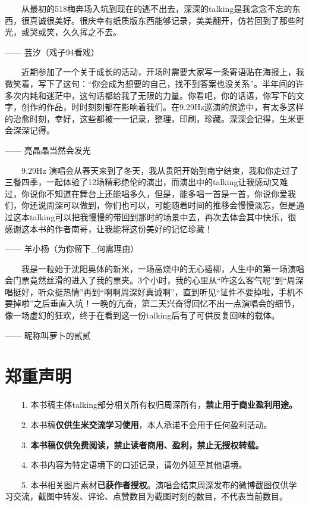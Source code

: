 \documentclass[]{ctexbook}
\begin{document}
  从最初的518梅奔场入坑到现在的逃不出去，深深的talking是我念念不忘的东西，很真诚很美好。很庆幸有纸质版东西能够记录，美美翻开，仿若回到了那些时光，或哭或笑，久久挥之不去。

------ 芸汐（戏子94看戏）

  近期参加了一个关于成长的活动，开场时需要大家写一条寄语贴在海报上，我微笑着，写下了这句：``你会成为想要的自己，找不到答案也没关系''。半年间的许多次内耗和迷茫中，这句话都给我了无限的力量。你看吧，你的话语，你写下的文字，创作的作品，时时刻刻都在影响着我们。在9.29Hz巡演的旅途中，有太多这样的治愈时刻，幸好，这些都被一一记录，整理，印刷，珍藏。深深会记得，生米更会深深记得。

------ 亮晶晶当然会发光

  9.29Hz 演唱会从春天来到了冬天，我从贵阳开始到南宁结束，我和你走过了三餐四季，一起体验了12场精彩绝伦的演出，而演出中的talking让我感动又难过，你说你不知道在舞台上还能唱多久，但是，能多唱一首是一首，你说你爱我们，你还说周深可以做到，你们也可以，可能随着时间的推移会慢慢淡忘，但是通过这本talking可以把我慢慢的带回到那时的场景中去，再次去体会其中快乐，很感谢这本书的作者南哥，让我能将这份美好的记忆珍藏！

------ 羊小杨（为你留下\_何需理由）

  我是一粒始于沈阳奥体的新米，一场高烧中的无心插柳，人生中的第一场演唱会门票竟然丝滑的进入了我的票夹。3个小时，我的心里从``咋这么客气呢''到``周深唱挺好，听众挺热情''再到``啊啊周深好真诚啊''，直到听见``证件不要掉啦，手机不要掉啦''之后垂直入坑！一晚的亢奋，第二天兴奋得回忆不出一点演唱会的细节，像一场虚幻的狂欢，终于在看到这一份talking后有了可供反复回味的载体。

------ 昵称叫萝卜的贰贰

\newpage

\section*{郑重声明}\label{declaration}


  1. 本书稿主体talking部分相关所有权归周深所有，\textbf{禁止用于商业盈利用途。}

  2. 本书稿\textbf{仅供生米交流学习使用}，本人承诺不会用于任何盈利活动。

  3. \textbf{本书稿仅供免费阅读，禁止读者商用、盈利，禁止无授权转载。}

  4. 本书内容为特定语境下的口述记录，请勿外延至其他语境。

  5. 本书相关图片素材\textbf{已获作者授权}。演唱会结束周深发布的微博截图仅供学习交流，截图中转发、评论、点赞数目为截图时刻的数目，不代表当前数目。
\end{document}
